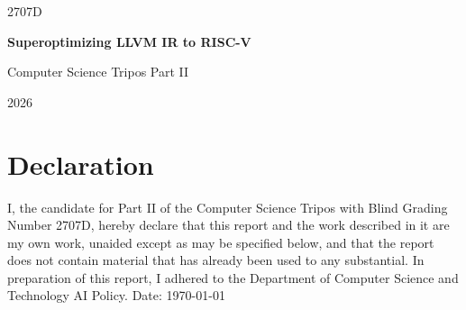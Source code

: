 \documentclass[12pt, a4paper, oneside]{book}
\newif\ifdraft
\newcommand{\myTitle}{Superoptimizing LLVM IR to RISC-V}
\newcommand{\myBGN}{2707D}
\newcommand{\myYear}{2026}
\newcommand{\myDate}{\today}
\begin{document}

\begin{titlepage}
    \raggedleft \myBGN \par
    \centering
    \vspace*{4cm}
    {\Huge \bfseries \myTitle \par}
    \ifdraft
    {\Huge \color{red} \bf DRAFT \par}
    \fi
    \vspace{2cm}
    {\Large Computer Science Tripos Part II \par}
    \vspace{1cm}
    {\Large \myYear \par}
\end{titlepage}


\newpage
\thispagestyle{plain}
\section*{Declaration}
I, the candidate for Part II of the Computer Science Tripos with Blind Grading Number 
\myBGN, hereby declare that this report and the work described in it are my own work, 
unaided except as may be specified below, and that the report does not contain material 
that has already been used to any substantial. In preparation of this report, I adhered 
to the Department of Computer Science and Technology AI Policy.
\vspace{1cm}
\noindent Date: \myDate



\tableofcontents

\clearpage
{}



\printbibliography

\end{document}
